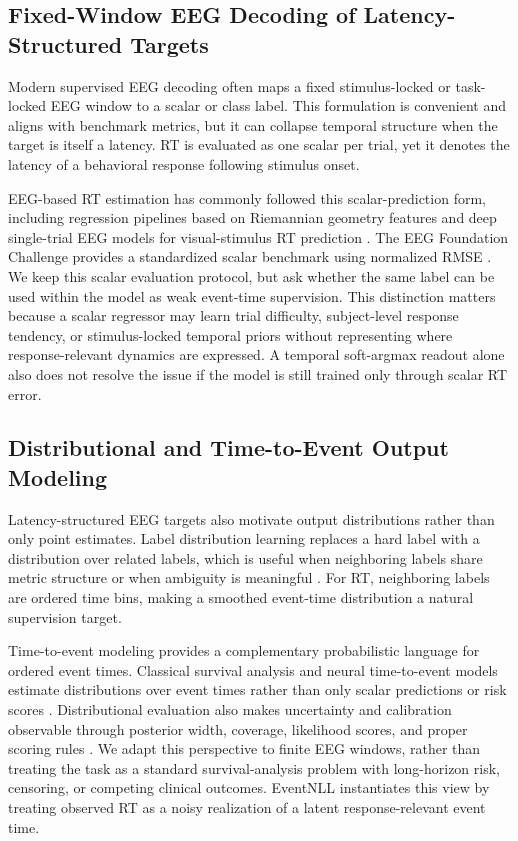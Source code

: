 \documentclass[12pt]{article}
\begin{document}
\subsection{Fixed-Window EEG Decoding of Latency-Structured Targets}
Modern supervised EEG decoding often maps a fixed stimulus-locked or task-locked EEG window to a scalar or class label. This formulation is convenient and aligns with benchmark metrics, but it can collapse temporal structure when the target is itself a latency. RT is evaluated as one scalar per trial, yet it denotes the latency of a behavioral response following stimulus onset.

EEG-based RT estimation has commonly followed this scalar-prediction form, including regression pipelines based on Riemannian geometry features \citep{Wu2017RiemannianRT} and deep single-trial EEG models for visual-stimulus RT prediction \citep{Chowdhury2020RTSensors}. The EEG Foundation Challenge provides a standardized scalar benchmark using normalized RMSE \citep{EEGFoundationChallengeArxiv2025,EEGChallengeWebsite2025}. We keep this scalar evaluation protocol, but ask whether the same label can be used within the model as weak event-time supervision. This distinction matters because a scalar regressor may learn trial difficulty, subject-level response tendency, or stimulus-locked temporal priors without representing where response-relevant dynamics are expressed. A temporal soft-argmax readout alone also does not resolve the issue if the model is still trained only through scalar RT error.

\subsection{Distributional and Time-to-Event Output Modeling}
Latency-structured EEG targets also motivate output distributions rather than only point estimates. Label distribution learning replaces a hard label with a distribution over related labels, which is useful when neighboring labels share metric structure or when ambiguity is meaningful \citep{Geng2016LabelDistributionLearning}. For RT, neighboring labels are ordered time bins, making a smoothed event-time distribution a natural supervision target.

Time-to-event modeling provides a complementary probabilistic language for ordered event times. Classical survival analysis and neural time-to-event models estimate distributions over event times rather than only scalar predictions or risk scores \citep{Cox1972CoxPH,Lee2018DeepHit}. Distributional evaluation also makes uncertainty and calibration observable through posterior width, coverage, likelihood scores, and proper scoring rules \citep{Chapfuwa2023Calibration,Haider2020SurvivalDistributions}. We adapt this perspective to finite EEG windows, rather than treating the task as a standard survival-analysis problem with long-horizon risk, censoring, or competing clinical outcomes. EventNLL instantiates this view by treating observed RT as a noisy realization of a latent response-relevant event time.
\end{document}

